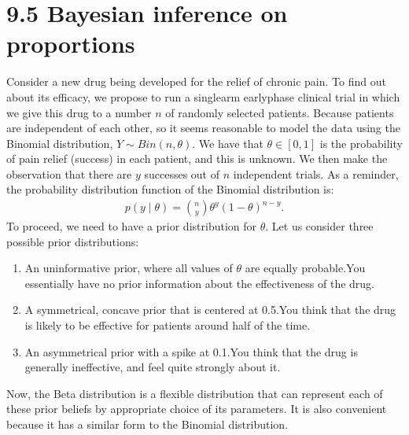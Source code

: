 \documentclass[letterpaper,10pt,english]{jupyterBook}
\begin{document}
\section{9.5 Bayesian inference on proportions}
\label{\detokenize{09.f. Bayesian Statistics I:bayesian-inference-on-proportions}}\label{\detokenize{09.f. Bayesian Statistics I::doc}}
\sphinxAtStartPar
Consider a new drug being developed for the relief of chronic pain. To find out about its efficacy, we propose to run a single\sphinxhyphen{}arm early\sphinxhyphen{}phase clinical trial in which we give this drug to a number \(n\) of randomly selected patients. Because patients are independent of each other, so it seems reasonable to model the data using the Binomial distribution, \(Y\sim Bin(n,\theta).\) We have that \(\theta\in [0,1]\) is the probability of pain relief (success) in each patient, and this is unknown. We then make the observation that there are \(y\) successes out of \(n\) independent trials. As a reminder, the probability distribution function of the Binomial distribution is:
\begin{equation*}
\begin{split}
p \left(y \mid \theta \right) = {n \choose y} \theta^y (1-\theta)^{n-y}.
\end{split}
\end{equation*}
\sphinxAtStartPar
To proceed, we need to have a prior distribution for \(\theta\). Let us consider three possible prior distributions:
\begin{enumerate}
%
\item {} 
\sphinxAtStartPar
An uninformative prior, where all values of \(\theta\) are equally probable.You essentially have no prior information about the effectiveness of the drug.

\item {} 
\sphinxAtStartPar
A symmetrical, concave prior that is centered at 0.5.You think that the drug is likely to be effective for patients around half of the time.

\item {} 
\sphinxAtStartPar
An asymmetrical prior with a spike at 0.1.You think that the drug is generally ineffective, and feel quite strongly about it.

\end{enumerate}

\sphinxAtStartPar
Now, the Beta distribution is a flexible distribution that can represent each of these prior beliefs by appropriate choice of its parameters. It is also convenient because it has a similar form to the Binomial distribution.
\end{document}
